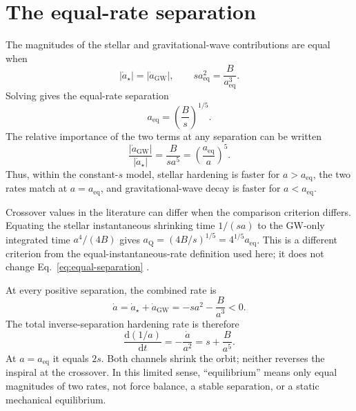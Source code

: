 \documentclass[12pt]{article}
\begin{document}
\section{The equal-rate separation}

The magnitudes of the stellar and gravitational-wave contributions are equal when
\begin{equation}
  |\dot a_\star|=|\dot a_{\mathrm{GW}}|,
  \qquad
  sa_{\mathrm{eq}}^2=\frac{B}{a_{\mathrm{eq}}^3}.
  \label{eq:equal-rates}
\end{equation}
Solving gives the equal-rate separation
\begin{equation}
  \boxed{a_{\mathrm{eq}}=\left(\frac{B}{s}\right)^{1/5}.}
  \label{eq:equal-separation}
\end{equation}
The relative importance of the two terms at any separation can be written
\begin{equation}
  \frac{|\dot a_{\mathrm{GW}}|}{|\dot a_\star|}
  =\frac{B}{sa^5}
  =\left(\frac{a_{\mathrm{eq}}}{a}\right)^5.
  \label{eq:rate-ratio}
\end{equation}
Thus, within the constant-$s$ model, stellar hardening is faster for $a>a_{\mathrm{eq}}$, the two rates match at $a=a_{\mathrm{eq}}$, and gravitational-wave decay is faster for $a<a_{\mathrm{eq}}$.

Crossover values in the literature can differ when the comparison criterion differs. Equating the stellar instantaneous shrinking time $1/(sa)$ to the GW-only integrated time $a^4/(4B)$ gives $a_{\mathrm Q}=(4B/s)^{1/5}=4^{1/5}a_{\mathrm{eq}}$. This is a different criterion from the equal-instantaneous-rate definition used here; it does not change Eq.~\eqref{eq:equal-separation} \cite{Quinlan}.

At every positive separation, the combined rate is
\begin{equation}
  \dot a=\dot a_\star+\dot a_{\mathrm{GW}}
  =-sa^2-\frac{B}{a^3}<0.
  \label{eq:combined-rate}
\end{equation}
The total inverse-separation hardening rate is therefore
\begin{equation}
  \frac{\mathrm{d}(1/a)}{\mathrm{d}t}
  =-\frac{\dot a}{a^2}
  =s+\frac{B}{a^5}.
  \label{eq:total-hardening-rate}
\end{equation}
At $a=a_{\mathrm{eq}}$ it equals $2s$. Both channels shrink the orbit; neither reverses the inspiral at the crossover. In this limited sense, ``equilibrium'' means only equal magnitudes of two rates, not force balance, a stable separation, or a static mechanical equilibrium.
\end{document}
